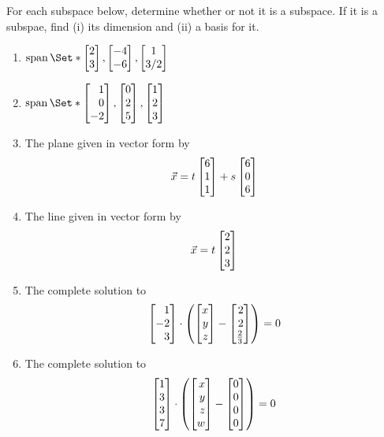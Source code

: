 \begin{exercises}
\begin{problist}
		\prob For each subspace below, determine whether or not it is a subspace.
		If it is a subspae, find (i) its dimension and (ii) a basis for it.
		\begin{enumerate}
			\item $\Span\Set*{\mat{2\\3}, \mat{-4\\-6}, \matc{1\\3/2}}$
			\item $\Span\Set*{\mat{1\\0\\-2}, \mat{0\\2\\5}, \mat{1\\2\\3}}$
			\item The plane given in vector form by
			\[
				\vec x = t\mat{6\\1\\1}+s\mat{6\\0\\6}
			\]
			\item The line given in vector form by
			\[
				\vec x = t\mat{2\\2\\3}
			\]
			\item The complete solution to
			\[
				\mat{1\\-2\\3} \cdot \left(\mat{x\\y\\z}-\mat{2\\2\\\frac{2}{3}}\right)=0
			\]
			\item The complete solution to
			\[
				\mat{1\\3\\3\\7} \cdot \left(\mat{x\\y\\z\\w}-\mat{0\\0\\0\\0}\right)=0
			\]
		\end{enumerate}
		\begin{solution}
		
		\end{solution}
		

\end{problist}
\end{exercises}
